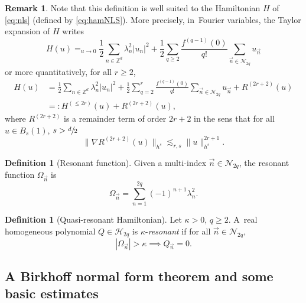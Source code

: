 \documentclass[10pt]{amsart}
\theoremstyle{plain}
\theoremstyle{definition}
\newtheorem{definition}[theorem]{Definition}
\newtheorem{remark}[theorem]{Remark}
\newcommand{\1}{\mathbf{1}}
\begin{document}
\begin{remark} Note that this definition is well suited to the Hamiltonian $H$ of \eqref{eq:nls} (defined by \eqref{eq:hamNLS}). More precisely, in~Fourier variables, the Taylor expansion of $H$ writes
\[
H(u) \mathop{=}_{u \to 0} \frac12 \sum_{n\in \mathbb{Z}^d} \lambda_n^2 |u_n|^2 + \frac12 \sum_{q\geq 2} \frac{f^{(q-1)}(0)}{q!} \sum_{\vec{n}\in\mathcal{N}_{2q}} u_{\vec{n}}
\]
or more quantitatively, for all $r\geq 2$,
\begin{equation}
\label{eq:expansion_ham}
\begin{split}
H(u) &= \frac12 \sum_{n\in \mathbb{Z}^d} \lambda_n^2 |u_n|^2 + \frac12 \sum_{q=2}^r \frac{f^{(q-1)}(0)}{q!} \sum_{\vec{n}\in\mathcal{N}_{2q}} u_{\vec{n}}+ R^{(2r+2)} (u) \\ &=:H^{(\leq 2r)}(u) + R^{(2r+2)} (u),
\end{split}
\end{equation}
where $R^{(2r+2)} $ is a remainder term of order $2r+2$ in the sens that for all $u\in B_s(1)$, $s>\sfrac{d}{2}$
\begin{equation}
\label{eq:rem_NLS}
\| \nabla R^{(2r+2)} (u) \|_{h^s} \lesssim_{r,s} \| u \|_{h^s}^{2r+1}.
\end{equation}
\end{remark}

\begin{definition}[Resonant function] Given a multi-index $\vec{n}\in\mathcal{N}_{2q}$, the resonant function $\Omega_{\vec{n}}$ is
\[
\Omega_{\vec{n}} = \sum_{n=1}^{2q}(-1)^{n+1}\lambda_{n}^{2}.
\]
\end{definition}

\begin{definition}[Quasi-resonant Hamiltonian]\label{def:non-kappa} Let $\kappa>0$, $q\geq2$. A~real homogeneous polynomial $Q \in \mathcal{H}_{2q}$
is $\kappa$-\emph{resonant} if for all $\vec{n}\in\mathcal{N}_{2q}$,
\[
|\Omega_{\vec{n}}| > \kappa\implies Q_{\vec{n}} = 0.
\]
\end{definition}
\setcounter{theorem}{7}
\subsection{A Birkhoff normal form theorem and some basic estimates}
\end{document}
